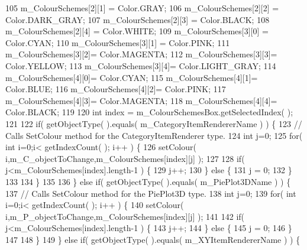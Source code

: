 \begin{DoxyCode}
105             m\_ColourSchemes[2][1] = Color.GRAY;
106             m\_ColourSchemes[2][2] = Color.DARK\_GRAY;
107             m\_ColourSchemes[2][3] = Color.BLACK;
108             m\_ColourSchemes[2][4] = Color.WHITE;
109             m\_ColourSchemes[3][0] = Color.CYAN;
110             m\_ColourSchemes[3][1] = Color.PINK;
111             m\_ColourSchemes[3][2]= Color.MAGENTA;
112             m\_ColourSchemes[3][3]= Color.YELLOW;
113             m\_ColourSchemes[3][4]= Color.LIGHT\_GRAY;
114             m\_ColourSchemes[4][0]= Color.CYAN;
115             m\_ColourSchemes[4][1]= Color.BLUE;
116             m\_ColourSchemes[4][2]= Color.PINK;
117             m\_ColourSchemes[4][3]= Color.MAGENTA;
118             m\_ColourSchemes[4][4]= Color.BLACK;
119             
120             \textcolor{keywordtype}{int} index = m\_ColourSchemesBox.getSelectedIndex(  );
121             
122             \textcolor{keywordflow}{if}( getObjectType(  ).equals( m\_CategoryItemRendererName ) ) \{
123                 \textcolor{comment}{// Calls SetColour method for the CategoryItemRenderer type.}
124                 \textcolor{keywordtype}{int} j=0;
125                 \textcolor{keywordflow}{for}( \textcolor{keywordtype}{int} i=0;i< getIndexCount(  ); i++ ) \{
126                     setColour( i,m\_C\_objectToChange,m\_ColourSchemes[index][j] );
127                     
128                     \textcolor{keywordflow}{if}( j<m\_ColourSchemes[index].length-1 ) \{
129                         j++;
130                     \} \textcolor{keywordflow}{else} \{
131                         j = 0;
132                     \}
133                     
134                 \}
135                 
136             \} \textcolor{keywordflow}{else} \textcolor{keywordflow}{if}( getObjectType(  ).equals( m\_PiePlot3DName ) ) \{
137                 \textcolor{comment}{// Calls SetColour method for the PiePlot3D type.}
138                 \textcolor{keywordtype}{int} j=0;
139                 \textcolor{keywordflow}{for}( \textcolor{keywordtype}{int} i=0;i< getIndexCount(  ); i++ ) \{
140                     setColour( i,m\_P\_objectToChange,m\_ColourSchemes[index][j] );
141                     
142                     \textcolor{keywordflow}{if}( j<m\_ColourSchemes[index].length-1 ) \{
143                         j++;
144                     \} \textcolor{keywordflow}{else} \{
145                         j = 0;
146                     \}
147                     
148                 \}
149             \} \textcolor{keywordflow}{else} \textcolor{keywordflow}{if}( getObjectType(  ).equals( m\_XYItemRendererName ) ) \{

\end{DoxyCode}
